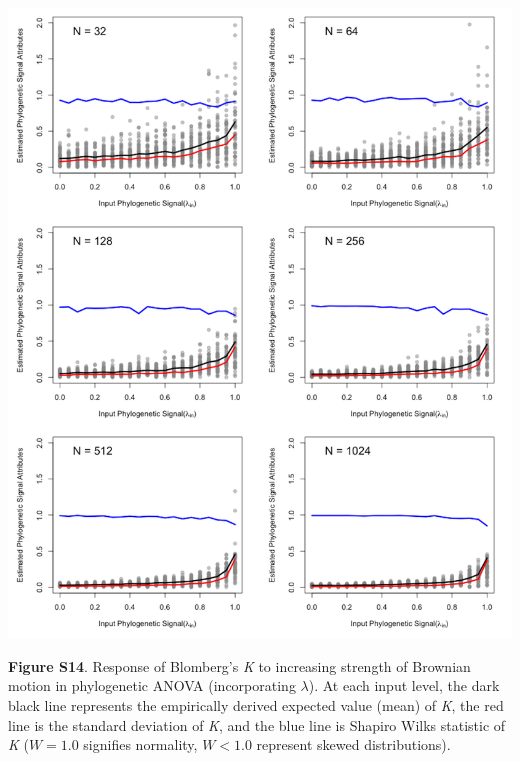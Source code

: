 \documentclass[
]{article}
\begin{document}
\includegraphics[width=0.95\linewidth]{fig.S14}

\textbf{Figure S14}. Response of Blomberg's \textit{K} to increasing
strength of Brownian motion in phylogenetic ANOVA (incorporating
\(\lambda\)). At each input level, the dark black line represents the
empirically derived expected value (mean) of \textit{K}, the red line is
the standard deviation of \textit{K}, and the blue line is Shapiro Wilks
statistic of \textit{K} (\(W=1.0\) signifies normality, \(W< 1.0\)
represent skewed distributions).
\end{document}

